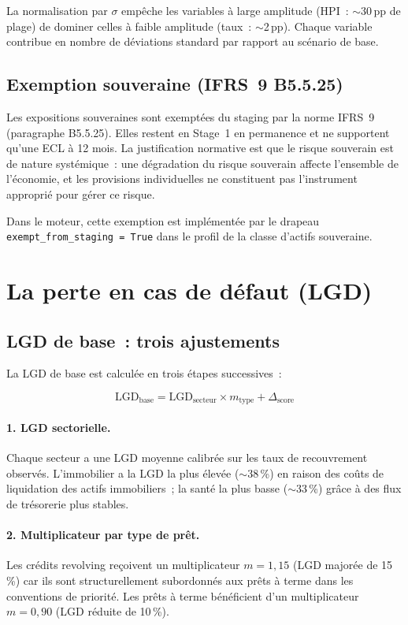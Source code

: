 \documentclass[12pt, a4paper, twoside, openright]{report}
\theoremstyle{definition}
\begin{document}
La normalisation par $\sigma$ empêche les variables à large amplitude (HPI~: $\sim$30\,pp de plage) de dominer celles à faible amplitude (taux~: $\sim$2\,pp). Chaque variable contribue en nombre de déviations standard par rapport au scénario de base.

\subsection{Exemption souveraine (IFRS~9 B5.5.25)}

Les expositions souveraines sont exemptées du staging par la norme IFRS~9 (paragraphe B5.5.25). Elles restent en Stage~1 en permanence et ne supportent qu'une ECL à 12 mois. La justification normative est que le risque souverain est de nature systémique~: une dégradation du risque souverain affecte l'ensemble de l'économie, et les provisions individuelles ne constituent pas l'instrument approprié pour gérer ce risque.

Dans le moteur, cette exemption est implémentée par le drapeau \texttt{exempt\_from\_staging = True} dans le profil de la classe d'actifs souveraine.

\section{La perte en cas de défaut (LGD)}
\label{sec:ecl:lgd}

\subsection{LGD de base~: trois ajustements}

La LGD de base est calculée en trois étapes successives~:

\begin{equation}
\text{LGD}_{\text{base}} = \text{LGD}_{\text{secteur}} \times m_{\text{type}} + \Delta_{\text{score}}
\label{eq:lgd-base}
\end{equation}

\paragraph{1. LGD sectorielle.} Chaque secteur a une LGD moyenne calibrée sur les taux de recouvrement observés. L'immobilier a la LGD la plus élevée ($\sim$38\,\%) en raison des coûts de liquidation des actifs immobiliers~; la santé la plus basse ($\sim$33\,\%) grâce à des flux de trésorerie plus stables.

\paragraph{2. Multiplicateur par type de prêt.} Les crédits revolving reçoivent un multiplicateur $m = 1{,}15$ (LGD majorée de 15\,\%) car ils sont structurellement subordonnés aux prêts à terme dans les conventions de priorité. Les prêts à terme bénéficient d'un multiplicateur $m = 0{,}90$ (LGD réduite de 10\,\%).
\end{document}
